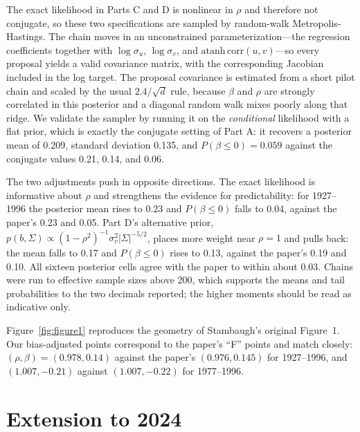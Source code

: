 \documentclass[11pt]{article}
\begin{document}
The exact likelihood in Parts C and D is nonlinear in $\rho$ and therefore not
conjugate, so these two specifications are sampled by random-walk
Metropolis-Hastings. The chain moves in an unconstrained parameterization---the
regression coefficients together with $\log\sigma_u$, $\log\sigma_v$, and
$\mathrm{atanh}\,\mathrm{corr}(u,v)$---so every proposal yields a valid
covariance matrix, with the corresponding Jacobian included in the log target.
The proposal covariance is estimated from a short pilot chain and scaled by the
usual $2.4/\sqrt{d}$ rule, because $\beta$ and $\rho$ are strongly correlated in
this posterior and a diagonal random walk mixes poorly along that ridge. We
validate the sampler by running it on the \emph{conditional} likelihood with a
flat prior, which is exactly the conjugate setting of Part A: it recovers a
posterior mean of 0.209, standard deviation 0.135, and $P(\beta \le 0) = 0.059$
against the conjugate values 0.21, 0.14, and 0.06.

The two adjustments push in opposite directions. The exact likelihood is
informative about $\rho$ and strengthens the evidence for predictability: for
1927--1996 the posterior mean rises to 0.23 and $P(\beta \le 0)$ falls to 0.04,
against the paper's 0.23 and 0.05. Part D's alternative prior, $p(b,\Sigma)
\propto (1-\rho^2)^{-1}\sigma_v^2|\Sigma|^{-5/2}$, places more weight near
$\rho = 1$ and pulls back: the mean falls to 0.17 and $P(\beta \le 0)$ rises to
0.13, against the paper's 0.19 and 0.10. All sixteen posterior cells agree with
the paper to within about 0.03. Chains were run to effective sample sizes above
200, which supports the means and tail probabilities to the two decimals
reported; the higher moments should be read as indicative only.

Figure~\ref{fig:figure1} reproduces the geometry of Stambaugh's original
Figure~1. Our bias-adjusted points correspond to the paper's ``F'' points 
and match closely:
$(\rho, \beta) = (0.978, 0.14)$ against the paper's $(0.976, 0.145)$ for
1927--1996, and $(1.007, -0.21)$ against $(1.007, -0.22)$ for 1977--1996.

\section{Extension to 2024}






\end{document}
